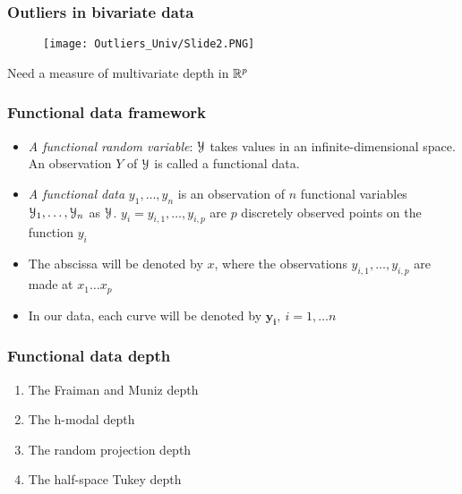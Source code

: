 \documentclass[10pt,dvipsnames,table]{beamer}
\begin{document}
\begin{frame}
\frametitle{Outliers in bivariate data}
\vspace{-0.5cm}
\begin{figure}[t]
\centering
\texttt{[image: Outliers\_Univ/Slide2.PNG]}
\end{figure}
\vspace{-0.5cm}
Need a measure of multivariate depth in $\mathbb{R} ^ p$
\end{frame}

\begin{frame}
\frametitle{Functional data framework}
\begin{itemize}
\item {\emph{A functional random variable}}: $\mathcal{Y}$ takes values in an infinite-dimensional space. An observation $Y$ of $\mathcal{Y}$ is called a functional data.
\item {\emph{A functional data}} $y_1, \dots, y_n$ is an observation of $n$ functional variables $\mathcal{Y}_1, \dots, \mathcal{Y}_n$ as $\mathcal{Y}$. $y_i = {y_{i,1}, \dots, y_{i,p}}$ are $p$ discretely observed points on the function $y_i$
\item The abscissa will be denoted by $x$, where the observations $y_{i,1}, \dots, y_{i,p}$ are made at $x_1 \dots x_p$
\item In our data, each curve will be denoted by $\mathbf{y_i}, \ i = 1, \dots n$
\end{itemize}
\end{frame}

\begin{frame}
\frametitle{Functional data depth}
\LARGE
\begin{enumerate}
\item The Fraiman and Muniz depth
\vspace{0.25in}
\item The h-modal depth
\vspace{0.25in}
\item The random projection depth
\vspace{0.25in}
\item The half-space Tukey depth
\end{enumerate}
\end{frame}
\end{document}
